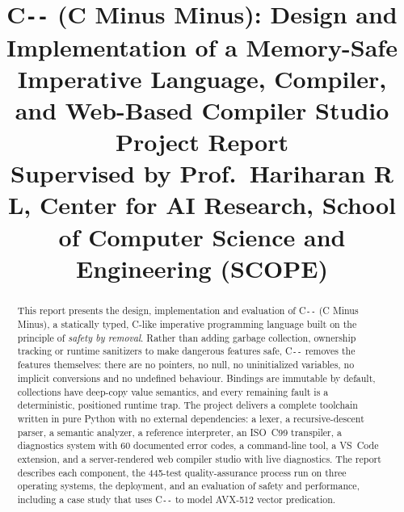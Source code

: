 \documentclass[conference]{IEEEtran}
\newcommand{\cmm}{C\texttt{-{}-}}
\begin{document}
\title{\cmm{} (C Minus Minus): Design and Implementation of a Memory-Safe Imperative Language, Compiler, and
Web-Based Compiler Studio\\[6pt]
\large Project Report\\[2pt]
\normalsize Supervised by Prof.\ Hariharan R L, Center for AI Research, School of Computer Science and Engineering (SCOPE)}

\author{
\and
{}
\and
{}
}

\maketitle

\begin{abstract}
This report presents the design, implementation and evaluation of \cmm{} (C Minus Minus), a statically
typed, C-like imperative programming language built on the principle of \emph{safety by removal}. Rather than
adding garbage collection, ownership tracking or runtime sanitizers to make dangerous features safe, \cmm{}
removes the features themselves: there are no pointers, no null, no uninitialized variables, no implicit
conversions and no undefined behaviour. Bindings are immutable by default, collections have deep-copy value
semantics, and every remaining fault is a deterministic, positioned runtime trap. The project delivers a
complete toolchain written in pure Python with no external dependencies: a lexer, a recursive-descent
parser, a semantic analyzer, a reference interpreter, an ISO~C99 transpiler, a diagnostics system with 60
documented error codes, a command-line tool, a VS~Code extension, and a server-rendered web compiler studio
with live diagnostics. The report describes each component, the 445-test quality-assurance process run on
three operating systems, the deployment, and an evaluation of safety and performance, including a case study
that uses \cmm{} to model AVX-512 vector predication.
\end{abstract}
\end{document}
